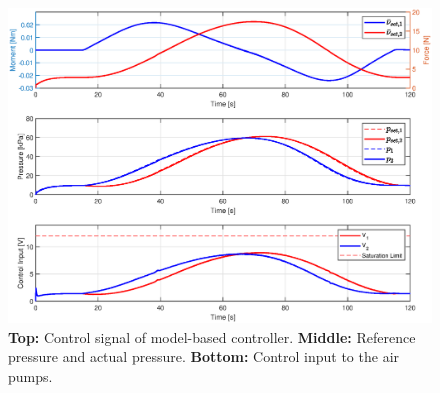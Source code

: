 \begin{figure}[H]
    \centering
    \includegraphics[width = \textwidth]{Figures/Chapter5/inputellipssim.eps}
    \caption{\textbf{Top:} Control signal of model-based controller. \textbf{Middle:} Reference pressure and actual pressure. \textbf{Bottom:} Control input to the air pumps.}
    \label{app5:controlinputellipssim}
\end{figure}
